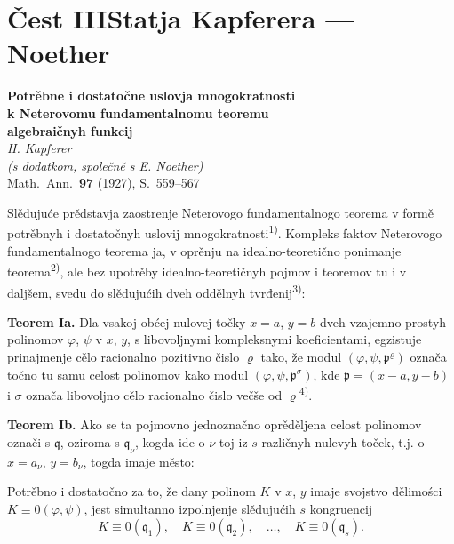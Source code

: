 \documentclass[11pt]{article}
\newcommand{\foreign}[1]{#1}
\theoremstyle{plain}
\begin{document}
\newpage
\part*{Čest III\hspace{1em}Statja Kapferera --- Noether}

\begin{center}
\Large\textbf{Potrěbne i dostatočne uslovja mnogokratnosti}\\[0.3em]
\Large\textbf{k Neterovomu fundamentalnomu teoremu}\\[0.5em]
\large\textbf{algebraičnyh funkcij}\\[1em]
\normalsize\textit{H. Kapferer}\\[0.5em]
\small\textit{(s dodatkom, společně s E. Noether)}\\[1em]
\normalsize \foreign{Math.\ Ann.}\ \textbf{97} (1927), S.~559--567
\end{center}

\vspace{1em}

Slědujuće prědstavja zaostrenje Neterovogo fundamentalnogo
teorema v formě potrěbnyh i dostatočnyh uslovij
mnogokratnosti\textsuperscript{1)}. Kompleks faktov Neterovogo
fundamentalnogo teorema ja, v oprěnju na idealno-teoretično
ponimanje teorema\textsuperscript{2)}, ale bez upotrěby
idealno-teoretičnyh pojmov i teoremov tu i v daljšem, svedu do
slědujućih dveh oddělnyh tvrđenij\textsuperscript{3)}:

\smallskip
\textbf{Teorem Ia.} Dla vsakoj obćej nulovej točky $x = a$,
$y = b$ dveh vzajemno prostyh polinomov $\varphi$, $\psi$ v $x$, $y$,
s libovoljnymi kompleksnymi koeficientami, egzistuje prinajmenje cělo
racionalno pozitivno čislo $\varrho$ tako, že modul
$(\varphi, \psi, \mathfrak{p}^{\varrho})$ označa točno tu samu
celost polinomov kako modul $(\varphi, \psi, \mathfrak{p}^{\sigma})$,
kde $\mathfrak{p} = (x-a, y-b)$ i $\sigma$ označa libovoljno cělo
racionalno čislo večše od $\varrho$\textsuperscript{4)}.

\smallskip
\textbf{Teorem Ib.} Ako se ta pojmovno jednoznačno oprěděljena
celost polinomov označi s $\mathfrak{q}$, oziroma s
$\mathfrak{q}_{\nu}$, kogda ide o $\nu$-toj iz $s$ različnyh nulevyh
toček, t.j. o $x = a_{\nu}$, $y = b_{\nu}$, togda imaje město:

Potrěbno i dostatočno za to, že dany polinom $K$ v $x$, $y$ imaje
svojstvo dělimości $K \equiv 0(\varphi, \psi)$, jest simultanno
izpolnjenje slědujućih $s$ kongruencij
\[
K \equiv 0(\mathfrak{q}_{1}), \quad K \equiv 0(\mathfrak{q}_{2}), \quad\ldots,\quad
K \equiv 0(\mathfrak{q}_{s}).
\]
\end{document}
